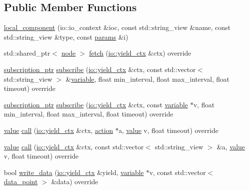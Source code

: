 \subsection*{Public Member Functions}
\begin{DoxyCompactItemize}
\item 
\hyperlink{classtelegraph_1_1local__component_a4cd9cd1728ba53391553b81dbb4e3494}{local\+\_\+component} (io\+::io\+\_\+context \&ioc, const std\+::string\+\_\+view \&name, const std\+::string\+\_\+view \&type, const \hyperlink{classtelegraph_1_1params}{params} \&i)
\item 
std\+::shared\+\_\+ptr$<$ \hyperlink{classtelegraph_1_1node}{node} $>$ \hyperlink{classtelegraph_1_1local__component_abbeb3b12dc95e19e1a2972e9a374fd33}{fetch} (\hyperlink{structboost_1_1asio_1_1yield__ctx}{io\+::yield\+\_\+ctx} \&ctx) override
\item 
\hyperlink{namespacetelegraph_a58641aa5b1a2cbdb0431916a87069f64}{subscription\+\_\+ptr} \hyperlink{classtelegraph_1_1local__component_a53aa0199bd938578a6400cfd3a19c86f}{subscribe} (\hyperlink{structboost_1_1asio_1_1yield__ctx}{io\+::yield\+\_\+ctx} \&ctx, const std\+::vector$<$ std\+::string\+\_\+view $>$ \&\hyperlink{classtelegraph_1_1variable}{variable}, float min\+\_\+interval, float max\+\_\+interval, float timeout) override
\item 
\hyperlink{namespacetelegraph_a58641aa5b1a2cbdb0431916a87069f64}{subscription\+\_\+ptr} \hyperlink{classtelegraph_1_1local__component_a5a2282f1cf80dce32ed26e37c956d5c4}{subscribe} (\hyperlink{structboost_1_1asio_1_1yield__ctx}{io\+::yield\+\_\+ctx} \&ctx, const \hyperlink{classtelegraph_1_1variable}{variable} $\ast$v, float min\+\_\+interval, float max\+\_\+interval, float timeout) override
\item 
\hyperlink{classtelegraph_1_1value}{value} \hyperlink{classtelegraph_1_1local__component_af4d74d161754055d3f811bfe95a59f26}{call} (\hyperlink{structboost_1_1asio_1_1yield__ctx}{io\+::yield\+\_\+ctx} \&ctx, \hyperlink{classtelegraph_1_1action}{action} $\ast$a, \hyperlink{classtelegraph_1_1value}{value} v, float timeout) override
\item 
\hyperlink{classtelegraph_1_1value}{value} \hyperlink{classtelegraph_1_1local__component_a6fa6fbf49a0d77a8da54b4a77b578edd}{call} (\hyperlink{structboost_1_1asio_1_1yield__ctx}{io\+::yield\+\_\+ctx} \&ctx, const std\+::vector$<$ std\+::string\+\_\+view $>$ \&a, \hyperlink{classtelegraph_1_1value}{value} v, float timeout) override
\item 
bool \hyperlink{classtelegraph_1_1local__component_ac546cfea4802ef3ca125c5dc183adf6c}{write\+\_\+data} (\hyperlink{structboost_1_1asio_1_1yield__ctx}{io\+::yield\+\_\+ctx} \&yield, \hyperlink{classtelegraph_1_1variable}{variable} $\ast$v, const std\+::vector$<$ \hyperlink{classtelegraph_1_1data__point}{data\+\_\+point} $>$ \&data) override

\end{DoxyCompactItemize}
